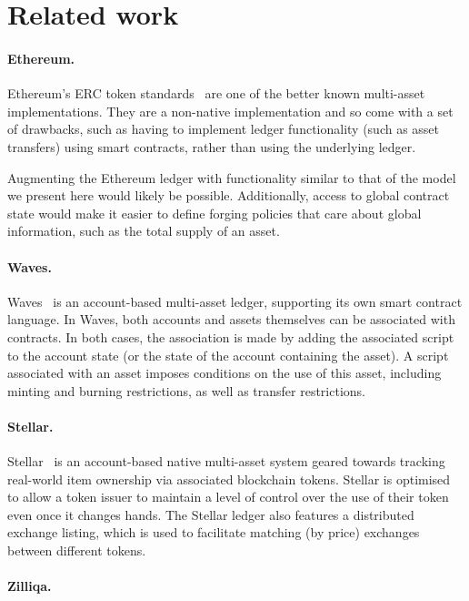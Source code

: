\section{Related work}

\paragraph{Ethereum.}

Ethereum's ERC token standards~\cite{erc20,erc721} are one of the better known multi-asset
implementations. They are a non-native implementation and so come with a set of drawbacks,
such as having to implement ledger functionality (such as asset transfers) using smart contracts, rather
than using the underlying ledger.

Augmenting the Ethereum ledger with functionality similar to that of the model
we present here would likely be possible. Additionally, access to global
contract state would make it easier to define forging policies that care about
global information, such as the total supply of an asset.

\paragraph{Waves.}

Waves~\cite{waves} is an account-based multi-asset ledger, supporting its own smart contract
language. In Waves, both accounts and assets themselves can
be associated with contracts. In both cases, the association is made by
adding the associated script
to the account state (or the state of the account containing the asset).
A script associated with an asset imposes conditions on the use of this asset,
including minting and burning restrictions, as well as transfer restrictions.

\paragraph{Stellar.}

Stellar~\cite{stellar} is an account-based native multi-asset system geared towards tracking
real-world item ownership via associated blockchain tokens.
Stellar is optimised to allow a token issuer to maintain a level of control over
the use of their token even once it changes hands. The Stellar ledger also features
a distributed exchange listing, which is used to
facilitate matching (by price) exchanges between different tokens.

\paragraph{Zilliqa.}

